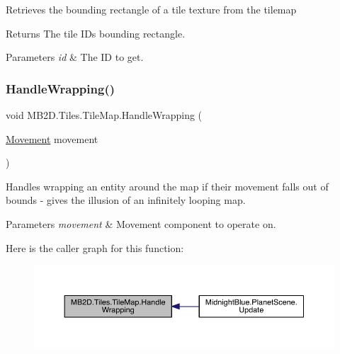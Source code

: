 Retrieves the bounding rectangle of a tile texture from the tilemap 

\begin{DoxyReturn}{Returns}
The tile ID\textquotesingle{}s bounding rectangle.
\end{DoxyReturn}

\begin{DoxyParams}{Parameters}
{\em id} & The ID to get.\\
\hline
\end{DoxyParams}
\hypertarget{class_m_b2_d_1_1_tiles_1_1_tile_map_ad00d974648e7f3070133569e5e98d261}{}\label{class_m_b2_d_1_1_tiles_1_1_tile_map_ad00d974648e7f3070133569e5e98d261} 
\subsubsection{\texorpdfstring{Handle\+Wrapping()}{HandleWrapping()}}
{\footnotesize\ttfamily void M\+B2\+D.\+Tiles.\+Tile\+Map.\+Handle\+Wrapping (\begin{DoxyParamCaption}\item[{\hyperlink{class_m_b2_d_1_1_entity_component_1_1_movement}{Movement}}]{movement }\end{DoxyParamCaption})\hspace{0.3cm}{\ttfamily [inline]}}



Handles wrapping an entity around the map if their movement falls out of bounds -\/ gives the illusion of an infinitely looping map. 


\begin{DoxyParams}{Parameters}
{\em movement} & Movement component to operate on.\\
\hline
\end{DoxyParams}
Here is the caller graph for this function\+:\nopagebreak
\begin{figure}[H]
\begin{center}
\leavevmode
\includegraphics[width=350pt]{class_m_b2_d_1_1_tiles_1_1_tile_map_ad00d974648e7f3070133569e5e98d261_icgraph}
\end{center}
\end{figure}


